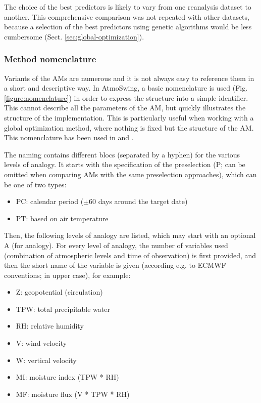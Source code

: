 \documentclass[gmdd]{copernicus}
\begin{document}
The choice of the best predictors is likely to vary from one reanalysis dataset to another. This comprehensive comparison was not repeated with other datasets, because a selection of the best predictors using genetic algorithms would be less cumbersome (Sect. \ref{sec:global-optimization}).


\subsubsection{Method nomenclature}

Variants of the AMs are numerous and it is not always easy to reference them in a short and descriptive way. In AtmoSwing, a basic nomenclature is used (Fig. \ref{figure:nomenclature}) in order to express the structure into a simple identifier. This cannot describe all the parameters of the AM, but quickly illustrates the structure of the implementation. This is particularly useful when working with a global optimization method, where nothing is fixed but the structure of the AM. This nomenclature has been used in \citet{Horton2017a, Horton2017b, Horton2018a} and \citet{Horton2018b}.

The naming contains different blocs (separated by a hyphen) for the various levels of analogy. It starts with the specification of the preselection (P; can be omitted when comparing AMs with the same preselection approaches), which can be one of two types:
\begin{itemize}
	\item PC: calendar period ($\pm 60$ days around the target date)
	\item PT: based on air temperature \citep{BenDaoud2010}
\end{itemize}

Then, the following levels of analogy are listed, which may start with an optional A (for analogy). For every level of analogy, the number of variables used (combination of atmospheric levels and time of observation) is first provided, and then the short name of the variable is given (according e.g. to ECMWF conventions; in upper case), for example:
\begin{itemize}
	\item Z: geopotential (circulation)
	\item TPW: total precipitable water
	\item RH: relative humidity
	\item V: wind velocity
	\item W: vertical velocity
	\item MI: moisture index (TPW * RH)
	\item MF: moisture flux (V * TPW * RH)
\end{itemize}
\end{document}

